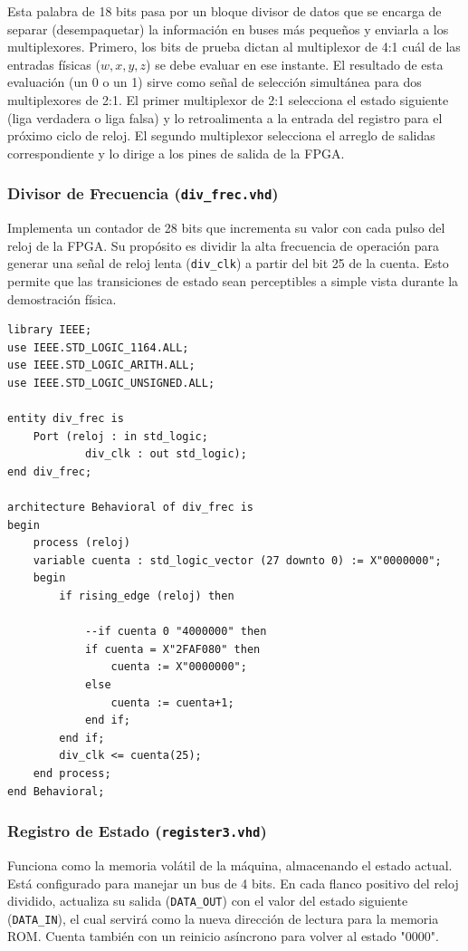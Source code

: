 \documentclass[12pt, letterpaper]{article}
\begin{document}
Esta palabra de 18 bits pasa por un bloque divisor de datos que se encarga de separar (desempaquetar) la información en buses más pequeños y enviarla a los multiplexores. Primero, los bits de prueba dictan al multiplexor de 4:1 cuál de las entradas físicas ($w, x, y, z$) se debe evaluar en ese instante. El resultado de esta evaluación (un 0 o un 1) sirve como señal de selección simultánea para dos multiplexores de 2:1. El primer multiplexor de 2:1 selecciona el estado siguiente (liga verdadera o liga falsa) y lo retroalimenta a la entrada del registro para el próximo ciclo de reloj. El segundo multiplexor selecciona el arreglo de salidas correspondiente y lo dirige a los pines de salida de la FPGA.

\subsubsection*{Divisor de Frecuencia (\texttt{div\_frec.vhd})}

Implementa un contador de 28 bits que incrementa su valor con cada pulso del reloj de la FPGA. Su propósito es dividir la alta frecuencia de operación para generar una señal de reloj lenta (\texttt{div\_clk}) a partir del bit 25 de la cuenta. Esto permite que las transiciones de estado sean perceptibles a simple vista durante la demostración física.

\begin{lstlisting}[style=vhdl, caption={Código completo del divisor de frecuencia.}, label={lst:div_frec}]
library IEEE;
use IEEE.STD_LOGIC_1164.ALL;
use IEEE.STD_LOGIC_ARITH.ALL;
use IEEE.STD_LOGIC_UNSIGNED.ALL;

entity div_frec is
	Port (reloj : in std_logic;
			div_clk : out std_logic);
end div_frec;

architecture Behavioral of div_frec is
begin
	process (reloj)
	variable cuenta : std_logic_vector (27 downto 0) := X"0000000";
	begin
		if rising_edge (reloj) then

			--if cuenta 0 "4000000" then
			if cuenta = X"2FAF080" then
				cuenta := X"0000000";
			else
				cuenta := cuenta+1;
			end if;
		end if;
		div_clk <= cuenta(25);
	end process;
end Behavioral;
\end{lstlisting}

\subsubsection*{Registro de Estado (\texttt{register3.vhd})}

Funciona como la memoria volátil de la máquina, almacenando el estado actual. Está configurado para manejar un bus de 4 bits. En cada flanco positivo del reloj dividido, actualiza su salida (\texttt{DATA\_OUT}) con el valor del estado siguiente (\texttt{DATA\_IN}), el cual servirá como la nueva dirección de lectura para la memoria ROM. Cuenta también con un reinicio asíncrono para volver al estado "0000".
\end{document}
